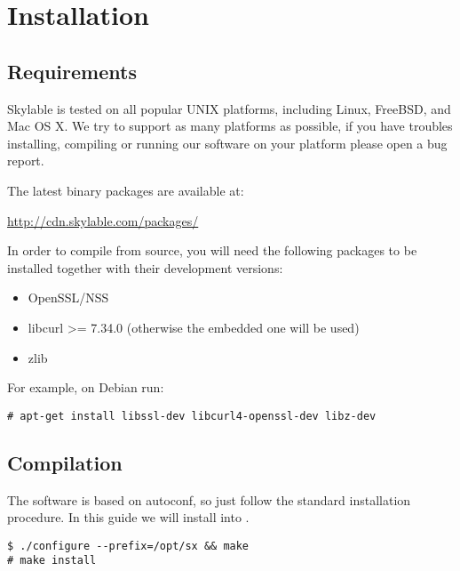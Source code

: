 \chapter{Installation}

\section*{Requirements}

Skylable \SX is tested on all popular UNIX platforms, including Linux,
FreeBSD, and Mac OS X. We try to support as many platforms as possible,
if you have troubles installing, compiling or running our software on
your platform please open a bug report.
\bigskip

The latest binary packages are available at:
\smallskip

\url{http://cdn.skylable.com/packages/}
\bigskip

In order to compile \SX from source, you
will need the following packages to be installed together with their
development versions:
\begin{itemize}
    \item OpenSSL/NSS
    \item libcurl >= 7.34.0 (otherwise the embedded one will be used)
    \item zlib
\end{itemize}
For example, on Debian run:
\begin{lstlisting}
# apt-get install libssl-dev libcurl4-openssl-dev libz-dev
\end{lstlisting}

\section*{Compilation}

The software is based on autoconf, so just follow the standard installation
procedure. In this guide we will install \SX into .
\begin{lstlisting}
$ ./configure --prefix=/opt/sx && make
# make install
\end{lstlisting}
